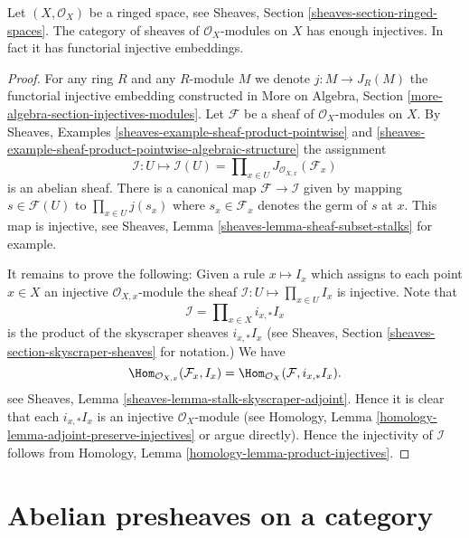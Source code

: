 \begin{lemma}
\label{lemma-sheaves-modules-space}
Let $(X, \mathcal{O}_X)$ be a ringed space, see
Sheaves, Section \ref{sheaves-section-ringed-spaces}.
The category of sheaves of $\mathcal{O}_X$-modules on $X$
has enough injectives. In fact it has functorial injective embeddings.
\end{lemma}

\begin{proof}
For any ring $R$ and any $R$-module $M$ we denote
$j : M \to J_R(M)$ the functorial
injective embedding constructed in
More on Algebra, Section \ref{more-algebra-section-injectives-modules}.
Let $\mathcal{F}$ be a sheaf of $\mathcal{O}_X$-modules on $X$.
By Sheaves, Examples \ref{sheaves-example-sheaf-product-pointwise}
and \ref{sheaves-example-sheaf-product-pointwise-algebraic-structure}
the assignment
$$
\mathcal{I} : U \mapsto
\mathcal{I}(U) = \prod\nolimits_{x\in U} J_{\mathcal{O}_{X, x}}(\mathcal{F}_x)
$$
is an abelian sheaf.
There is a canonical map $\mathcal{F} \to \mathcal{I}$
given by mapping $s \in \mathcal{F}(U)$ to $\prod_{x \in U} j(s_x)$
where $s_x \in \mathcal{F}_x$ denotes the germ of $s$ at $x$.
This map is injective, see
Sheaves, Lemma \ref{sheaves-lemma-sheaf-subset-stalks}
for example.

\medskip\noindent
It remains to prove the following: Given a rule
$x \mapsto I_x$ which assigns to each point $x \in X$ an injective
$\mathcal{O}_{X, x}$-module
the sheaf $\mathcal{I} : U \mapsto \prod_{x \in U} I_x$
is injective. Note that
$$
\mathcal{I} = \prod\nolimits_{x \in X} i_{x, *}I_x
$$
is the product of the skyscraper sheaves $i_{x, *}I_x$ (see
Sheaves, Section \ref{sheaves-section-skyscraper-sheaves} for notation.)
We have
$$
\Hom_{\mathcal{O}_{X, x}}(\mathcal{F}_x, I_x)
=
\Hom_{\mathcal{O}_X}(\mathcal{F}, i_{x, *}I_x).
$$
see Sheaves, Lemma \ref{sheaves-lemma-stalk-skyscraper-adjoint}. Hence it is
clear that each $i_{x, *}I_x$ is an injective $\mathcal{O}_X$-module
(see Homology, Lemma \ref{homology-lemma-adjoint-preserve-injectives} or argue
directly). Hence the injectivity of $\mathcal{I}$ follows from
Homology, Lemma \ref{homology-lemma-product-injectives}.
\end{proof}













\section{Abelian presheaves on a category}
\label{section-injectives-presheaves}

